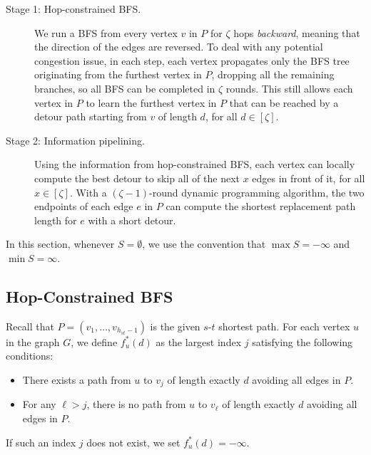 \begin{description}
    \item[Stage 1: Hop-constrained BFS.] We run a BFS from every vertex $v$ in $P$ for $\zeta$ hops \emph{backward}, meaning that the direction of the edges are reversed. To deal with any potential congestion issue, in each step, each vertex propagates only the BFS tree originating from the furthest vertex in $P$, dropping all the remaining branches, so all BFS can be completed in $\zeta$ rounds. This still allows each vertex in $P$ to learn the furthest vertex in $P$ that can be reached by a detour path starting from $v$ of length $d$, for all $d \in [\zeta]$. 
    \item[Stage 2: Information pipelining.] Using the information from hop-constrained BFS, each vertex can locally compute the best detour to skip all of the next $x$ edges in front of it, for all $x \in [\zeta]$. With a $(\zeta-1)$-round dynamic programming algorithm, the two endpoints of each edge $e$ in $P$ can compute the shortest replacement path length for $e$ with a short detour.
\end{description}

In this section, whenever $S = \emptyset$, we use the convention that $\max S = -\infty$ and $\min S = \infty$.



\subsection{Hop-Constrained BFS}


Recall that $P = (v_1, \ldots, v_{h_{st}-1})$ is the given $s$-$t$ shortest path.
For each vertex $u$ in the graph $G$, we define $f_u^\ast(d)$ as the largest index $j$ satisfying the following conditions:
\begin{itemize}
    \item There exists a path from $u$ to $v_j$ of length exactly $d$ avoiding all edges in $P$.
    \item For any $\ell > j$, there is no path from $u$ to $v_\ell$  of length exactly $d$ avoiding all edges in $P$.
\end{itemize}
If such an index $j$ does not exist, we set $f_u^\ast(d) = -\infty$. 

